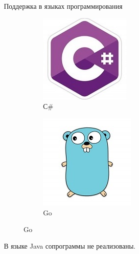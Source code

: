 \begin{frame}{Поддержка в языках программирования}
\begin{figure}
\begin{subfigure}[b]{0.25\linewidth}
		\includegraphics[width=\linewidth]{images/csharp.jpg} 
		\caption{С\#}
	\end{subfigure}
	\hfill
	\begin{subfigure}[b]{0.27\linewidth}
		\includegraphics[width=\linewidth]{images/go.jpg}
		\caption{Go}
	\end{subfigure}
	
	\end{figure}
	\par
	В языке Java сопрограммы не реализованы.
\end{frame}

